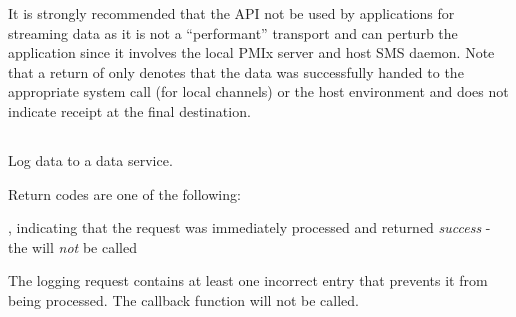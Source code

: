 \adviceuserstart
It is strongly recommended that the  API not be used by applications for streaming data as it is not a ``performant'' transport and can perturb the application since it involves the local \ac{PMIx} server and host \ac{SMS} daemon. Note that a return of  only denotes that the data was successfully handed to the appropriate system call (for local channels) or the host environment and does not indicate receipt at the final destination.
\adviceuserend

\subsection{}

\summary

Log data to a data service.

\format


\begin{arglist}
\end{arglist}

Return codes are one of the following:

\returnsimplenb

\returnstart
\begin{constantdesc}
\item {}, indicating that the request was immediately processed and returned \textit{success} - the  will \textit{not} be called
\item {} The logging request contains at least one incorrect entry that prevents it from being processed. The callback function will not be called.
\end{constantdesc}
\returnend

